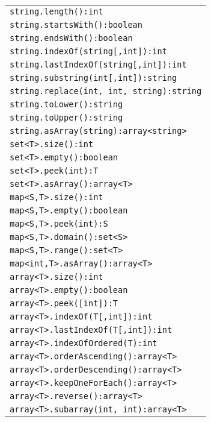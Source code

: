 \begin{table}[htbp]
\centering
\begin{tabular}{|l|}
\hline
\texttt{string.length():int}\\
\texttt{string.startsWith():boolean}\\
\texttt{string.endsWith():boolean}\\
\texttt{string.indexOf(string[,int]):int}\\
\texttt{string.lastIndexOf(string[,int]):int}\\
\texttt{string.substring(int[,int]):string}\\
\texttt{string.replace(int, int, string):string}\\
\texttt{string.toLower():string}\\
\texttt{string.toUpper():string}\\
\texttt{string.asArray(string):array<string>}\\
\hline
\texttt{set<T>.size():int}\\
\texttt{set<T>.empty():boolean}\\
\texttt{set<T>.peek(int):T}\\
\texttt{set<T>.asArray():array<T>}\\
\hline
\texttt{map<S,T>.size():int}\\
\texttt{map<S,T>.empty():boolean}\\
\texttt{map<S,T>.peek(int):S}\\
\texttt{map<S,T>.domain():set<S>}\\
\texttt{map<S,T>.range():set<T>}\\
\texttt{map<int,T>.asArray():array<T>}\\
\hline
\texttt{array<T>.size():int}\\
\texttt{array<T>.empty():boolean}\\
\texttt{array<T>.peek([int]):T}\\
\texttt{array<T>.indexOf(T[,int]):int}\\
\texttt{array<T>.lastIndexOf(T[,int]):int}\\
\texttt{array<T>.indexOfOrdered(T):int}\\
\texttt{array<T>.orderAscending():array<T>}\\
\texttt{array<T>.orderDescending():array<T>}\\
\texttt{array<T>.keepOneForEach():array<T>}\\
\texttt{array<T>.reverse():array<T>}\\
\texttt{array<T>.subarray(int, int):array<T>}\\

\end{tabular}
\end{table}
